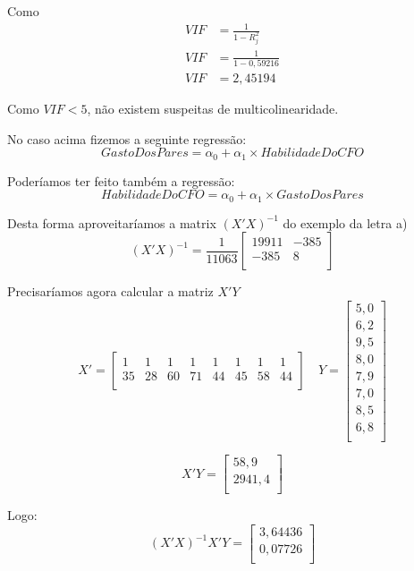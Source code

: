 \documentclass[]{ufpe-exercises}
\begin{document}
\begin{questions}
\begin{parts}
\begin{solution}
			Como
			\begin{align*}
				VIF & = \frac{1}{1 - R^{2}_{j}} \\
				VIF & = \frac{1}{1 - 0,59216}   \\
				VIF & = 2,45194
			\end{align*}

			Como \(VIF < 5\), não existem suspeitas de multicolinearidade.

			No caso acima fizemos a seguinte regressão:
			\[ GastoDosPares = \alpha_{0} + \alpha_{1} \times HabilidadeDoCFO \]

			Poderíamos ter feito também a regressão:
			\[ HabilidadeDoCFO = \alpha_{0} + \alpha_{1} \times GastoDosPares\]

			Desta forma aproveitaríamos a matrix \((X'X)^{-1}\) do exemplo da letra a)
			\[
				(X'X)^{-1} = \frac{1}{11063}
				\begin{bmatrix}
					19911 & -385 \\
					-385  & 8    \\
				\end{bmatrix}
			\]

			Precisaríamos agora calcular a matriz \(X'Y\)
			\[
				X' =
				\begin{bmatrix}
					1  & 1  & 1  & 1  & 1  & 1  & 1  & 1  \\
					35 & 28 & 60 & 71 & 44 & 45 & 58 & 44 \\
				\end{bmatrix} \quad
				Y =
				\begin{bmatrix}
					5,0 \\
					6,2 \\
					9,5 \\
					8,0 \\
					7,9 \\
					7,0 \\
					8,5 \\
					6,8 \\
				\end{bmatrix}
			\]

			\[
				X'Y =
				\begin{bmatrix}
					58,9   \\
					2941,4 \\
				\end{bmatrix}
			\]

			Logo:
			\[
				(X'X)^{-1}X'Y =
				\begin{bmatrix}
					3,64436 \\
					0,07726 \\
				\end{bmatrix}
			\]


\end{solution}
\end{parts}
\end{questions}
\end{document}
